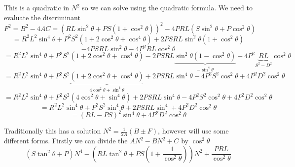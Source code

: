 This is a quadratic in $N^2$ so we can solve using the quadratic formula. We need to evaluate the discriminant
\begin{equation*}
	F^2 = B^2 - 4AC = \left( RL \sin^2 \theta + PS \left(1 + \cos^2 \theta\right) \right)^2 - 4PRL \left( S \sin^2 \theta + P \cos^2 \theta \right)
\end{equation*}
\begin{equation*}
	= R^2 L^2 \sin^4 \theta + P^2 S^2 \left( 1 + 2\cos^2 \theta + \cos^4 \theta \right) + 2 PSRL \sin^2 \theta \left( 1 + \cos^2 \theta \right)
\end{equation*}
\begin{equation*}
	 - 4PSRL \sin^2 \theta - 4 P^2 RL \cos^2 \theta
\end{equation*}
\begin{equation*}
	= R^2 L^2 \sin^4 \theta + P^2 S^2 \left( 1 + 2 \cos^2 \theta + \cos^4 \theta \right) - 2 PSRL \underbrace{\sin^2 \theta \left( 1 - \cos^2 \theta \right)}_{- \sin^4 \theta} - 4P^2 \underbrace{RL}_{S^2 - D^2} \cos^2 \theta
\end{equation*}
\begin{equation*}
	= R^2 L^2 \sin^4 \theta + P^2 S^2 \underbrace{\left( 1 + 2 \cos^2 \theta + \cos^4 \theta \right)}_{4 \cos^2 \theta + \sin^4 \theta} + 2 PSRL \sin^4 \theta - 4P^2S^2 \cos^2 \theta + 4P^2 D^2 \cos^2 \theta
\end{equation*}
\begin{equation*}
	= R^2 L^2 \sin^4 \theta + P^2 S^2 \left( 4 \cos^2 \theta + \sin^4 \theta \right) + 2PSRL \sin^4 \theta -4 P^2 S^2 \cos^2 \theta + 4 P^2 D^2 \cos^2 \theta
\end{equation*}
\begin{equation*}
	= R^2 L^2 \sin^4 \theta + P^2 S^2 \sin^4 \theta + 2PSRL \sin^4 + 4P^2 D^2 \cos^2 \theta
\end{equation*}
\begin{equation*}
	= \left( RL - PS \right)^2 \sin^4 \theta + 4P^2 D^2 \cos^2 \theta
\end{equation*}

Traditionally this has a solution $N^2 = \frac{1}{2A} \left( B \pm F \right)$, however will use some different forms. Firstly we can divide the $AN^2 - BN^2 + C$ by $\cos^2 \theta$
\begin{equation*}
	\left( S \tan^2 \theta + P \right)N^4 - \left( RL \tan^2 \theta + PS \left( 1 + \frac{1}{\cos^2 \theta} \right) \right) N^2 + \frac{PRL}{\cos^2 \theta}
\end{equation*}

